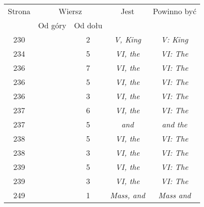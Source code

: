 \documentclass[a4paper,11pt]{article}
\begin{document}
\begin{center}
  \newpage

  \begin{tabular}{|c|c|c|c|c|}
    \hline
    Strona & \multicolumn{2}{c|}{Wiersz} & Jest
                              & Powinno być \\ \cline{2-3}
    & Od góry & Od dołu & & \\
    \hline
    230 & &  2 & \textit{V, King} & \textit{V: King} \\
    234 & &  5 & \textit{VI, the} & \textit{VI: The} \\
    236 & &  7 & \textit{VI, the} & \textit{VI: The} \\
    236 & &  5 & \textit{VI, the} & \textit{VI: The} \\
    236 & &  3 & \textit{VI, the} & \textit{VI: The} \\
    237 & &  6 & \textit{VI, the} & \textit{VI: The} \\
    237 & &  5 & \textit{and} & \textit{and the} \\
    238 & &  5 & \textit{VI, the} & \textit{VI: The} \\
    238 & &  3 & \textit{VI, the} & \textit{VI: The} \\
    239 & &  5 & \textit{VI, the} & \textit{VI: The} \\
    239 & &  3 & \textit{VI, the} & \textit{VI: The} \\
    249 & &  1 & \textit{Mass, and} & \textit{Mass and} \\
    \hline
  \end{tabular}






\end{center}
\end{document}
